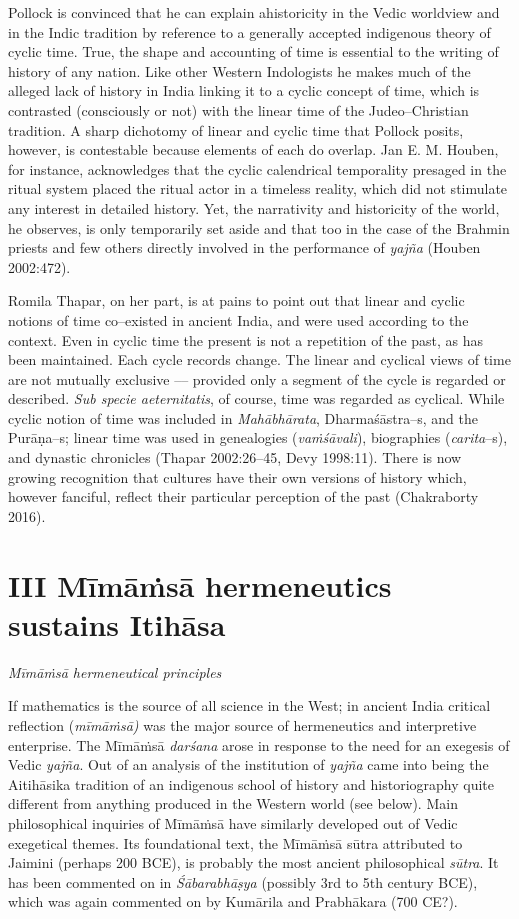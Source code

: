 Pollock is convinced that he can explain ahistoricity in the Vedic worldview and in the Indic tradition by reference to a generally accepted indigenous theory of cyclic time. True, the shape and accounting of time is essential to the writing of history of any nation. Like other Western Indologists he makes much of the alleged lack of history in India linking it to a cyclic concept of time, which is contrasted (consciously or not) with the linear time of the Judeo–Christian tradition. A sharp dichotomy of linear and cyclic time that Pollock posits, however, is contestable because elements of each do overlap. Jan E. M. Houben, for instance, acknowledges that the cyclic calendrical temporality presaged in the ritual system placed the ritual actor in a timeless reality, which did not stimulate any interest in detailed history. Yet, the narrativity and historicity of the world, he observes, is only temporarily set aside and that too in the case of the Brahmin priests and few others directly involved in the performance of \textit{yajña} (Houben 2002:472).

Romila Thapar, on her part, is at pains to point out that linear and cyclic notions of time co–existed in ancient India, and were used according to the context. Even in cyclic time the present is not a repetition of the past, as has been maintained. Each cycle records change. The linear and cyclical views of time are not mutually exclusive –– provided only a segment of the cycle is regarded or described. \textit{Sub specie aeternitatis}, of course, time was regarded as cyclical. While cyclic notion of time was included in \textit{Mahābhārata}, Dharmaśāstra–s, and the Purāṇa–s; linear time was used in genealogies (\textit{vaṁśāvali}), biographies (\textit{carita}–s), and dynastic chronicles (Thapar 2002:26–45, Devy 1998:11). There is now growing recognition that cultures have their own versions of history which, however fanciful, reflect their particular perception of the past (Chakraborty 2016).


\section*{III Mīmāṁsā hermeneutics sustains Itihāsa}

\textit{Mīmāṁsā hermeneutical principles}

If mathematics is the source of all science in the West; in ancient India critical reflection (\textit{mīmāṁsā) }was the major source of hermeneutics and interpretive enterprise. The Mīmāṁsā \textit{darśana} arose in response to the need for an exegesis of Vedic \textit{yajña}. Out of an analysis of the institution of \textit{yajña} came into being the Aitihāsika tradition of an indigenous school of history and historiography quite different from anything produced in the Western world (see below). Main philosophical inquiries of Mīmāṁsā have similarly developed out of Vedic exegetical themes. Its foundational text, the Mīmāṁsā sūtra attributed to Jaimini (perhaps 200 BCE), is probably the most ancient philosophical \textit{sūtra}. It has been commented on in \textit{Śābarabhāṣya} (possibly 3rd to 5th century BCE), which was again commented on by Kumārila and Prabhākara (700 CE?).

